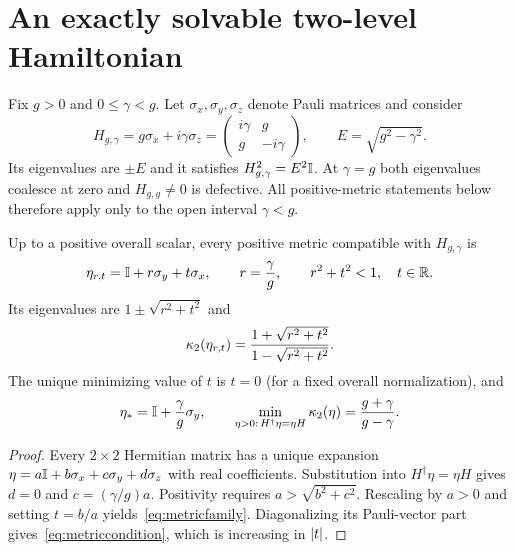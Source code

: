 \section{An exactly solvable two-level Hamiltonian}
Fix $g>0$ and $0\leq\gamma<g$. Let $\sigma_x,\sigma_y,\sigma_z$ denote Pauli
matrices and consider
\begin{equation}\label{eq:Hmodel}
 H_{g,\gamma}=g\sigma_x+i\gamma\sigma_z
 =\begin{pmatrix}i\gamma&g\\g&-i\gamma\end{pmatrix},
 \qquad E=\sqrt{g^2-\gamma^2}.
\end{equation}
Its eigenvalues are $\pm E$ and it satisfies $H_{g,\gamma}^2=E^2\mathbb{I}$.
At $\gamma=g$ both eigenvalues coalesce at zero and
$H_{g,g}\ne 0$ is defective. All positive-metric statements below therefore
apply only to the open interval $\gamma<g$.

\begin{proposition}\label{prop:metricfamily}
Up to a positive overall scalar, every positive metric compatible with
$H_{g,\gamma}$ is
\begin{equation}\label{eq:metricfamily}
 \eta_{r,t}=\mathbb{I}+r\sigma_y+t\sigma_x,
 \qquad r=\frac{\gamma}{g},\qquad r^2+t^2<1,
 \quad t\in\mathbb{R}.
\end{equation}
Its eigenvalues are $1\pm\sqrt{r^2+t^2}$ and
\begin{equation}\label{eq:metriccondition}
 \kappa_2(\eta_{r,t})
 =\frac{1+\sqrt{r^2+t^2}}{1-\sqrt{r^2+t^2}}.
\end{equation}
The unique minimizing value of $t$ is $t=0$ (for a fixed overall normalization),
and
\begin{equation}\label{eq:optimalmetric}
 \eta_*=\mathbb{I}+\frac{\gamma}{g}\sigma_y,
 \qquad \min_{\eta>0:\,H^\dagger\eta=\eta H}\kappa_2(\eta)
 =\frac{g+\gamma}{g-\gamma}.
\end{equation}
\end{proposition}
\begin{proof}
Every $2\times2$ Hermitian matrix has a unique expansion
$\eta=a\mathbb{I}+b\sigma_x+c\sigma_y+d\sigma_z$ with real coefficients.
Substitution into $H^\dagger\eta=\eta H$ gives
$d=0$ and $c=(\gamma/g)a$. Positivity requires
$a>\sqrt{b^2+c^2}$. Rescaling by $a>0$ and setting $t=b/a$
yields~\eqref{eq:metricfamily}. Diagonalizing its Pauli-vector part
gives~\eqref{eq:metriccondition}, which is increasing in $\left\lvert t\right\rvert$.
\end{proof}

